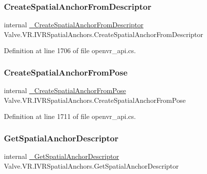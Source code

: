 \subsubsection{\texorpdfstring{CreateSpatialAnchorFromDescriptor}{CreateSpatialAnchorFromDescriptor}}
{\footnotesize\ttfamily internal \mbox{\hyperlink{struct_valve_1_1_v_r_1_1_i_v_r_spatial_anchors_ab4d806db18bce645affea7c6ea454059}{\+\_\+\+Create\+Spatial\+Anchor\+From\+Descriptor}} Valve.\+V\+R.\+I\+V\+R\+Spatial\+Anchors.\+Create\+Spatial\+Anchor\+From\+Descriptor}



Definition at line 1706 of file openvr\+\_\+api.\+cs.

\mbox{\label{struct_valve_1_1_v_r_1_1_i_v_r_spatial_anchors_a4f4aad5431055b8ea6db276a1f143d14}} 
\subsubsection{\texorpdfstring{CreateSpatialAnchorFromPose}{CreateSpatialAnchorFromPose}}
{\footnotesize\ttfamily internal \mbox{\hyperlink{struct_valve_1_1_v_r_1_1_i_v_r_spatial_anchors_a62e9fc61756a4d44558e01efefa17330}{\+\_\+\+Create\+Spatial\+Anchor\+From\+Pose}} Valve.\+V\+R.\+I\+V\+R\+Spatial\+Anchors.\+Create\+Spatial\+Anchor\+From\+Pose}



Definition at line 1711 of file openvr\+\_\+api.\+cs.

\mbox{\label{struct_valve_1_1_v_r_1_1_i_v_r_spatial_anchors_afdb3e3da5cafa105fcb162f90c1c9041}} 
\subsubsection{\texorpdfstring{GetSpatialAnchorDescriptor}{GetSpatialAnchorDescriptor}}
{\footnotesize\ttfamily internal \mbox{\hyperlink{struct_valve_1_1_v_r_1_1_i_v_r_spatial_anchors_aaf6ca9028d56903fe2a6ef154ae4dcab}{\+\_\+\+Get\+Spatial\+Anchor\+Descriptor}} Valve.\+V\+R.\+I\+V\+R\+Spatial\+Anchors.\+Get\+Spatial\+Anchor\+Descriptor}



